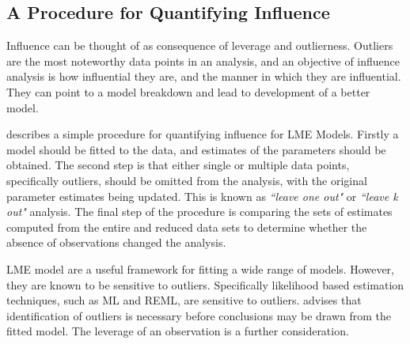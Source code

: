 \documentclass[12pt, a4paper]{report}
\theoremstyle{plain}
\theoremstyle{definition}
\theoremstyle{remark}
\begin{document}
\subsection{A Procedure for Quantifying Influence}  
Influence can be thought of as consequence of leverage and outlierness. Outliers are the most noteworthy data points in an analysis, and an objective of influence analysis is how influential they are, and the manner in which they are influential. They can point to a model breakdown and lead to development of a better model. 

\citet{schabenberger} describes a simple procedure for quantifying influence for LME Models. Firstly a model should be fitted to the data, and estimates of the parameters should be obtained. The second step is that either single or multiple data points, specifically outliers, should be omitted from the analysis, with the original parameter estimates being updated. This is known as \textit{``leave one out"} or \textit{``leave k out"} analysis. The final step of the procedure is comparing the sets of estimates computed from the entire and reduced data sets to determine whether the absence of observations changed the analysis. 



LME model are a useful framework for fitting a wide range of models. However, they are known to be sensitive to outliers. Specifically likelihood based estimation techniques, such as ML and REML, are sensitive to outliers. \citet{Christensen} advises that identification of outliers is necessary before conclusions may be drawn from the fitted model. The leverage of an observation is a further consideration. 


\end{document}
